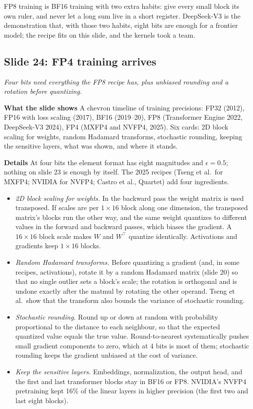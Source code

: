 \documentclass[11pt,letterpaper]{article}
\newcommand{\slide}[3]{%
  \subsection[Slide #1: #2]{Slide #1: #2}%
  {\color{muted}\itshape #3\par}\medskip}
\newcommand{\para}[1]{\medskip\noindent\textbf{#1}\quad}
\newenvironment{intuition}{\begin{tcolorbox}[intuitionbox]}{\end{tcolorbox}}
\begin{document}
\begin{intuition}
FP8 training is BF16 training with two extra habits: give every small block its own ruler, and never let a long sum live in a short register. DeepSeek-V3 is the demonstration that, with those two habits, eight bits are enough for a frontier model; the recipe fits on this slide, and the kernels took a team.
\end{intuition}

\slide{24}{FP4 training arrives}{Four bits need everything the FP8 recipe has, plus unbiased rounding and a rotation before quantizing.}

\para{What the slide shows} A chevron timeline of training precisions: FP32 (2012), FP16 with loss scaling (2017), BF16 (2019--20), FP8 (Transformer Engine 2022, DeepSeek-V3 2024), FP4 (MXFP4 and NVFP4, 2025). Six cards: 2D block scaling for weights, random Hadamard transforms, stochastic rounding, keeping the sensitive layers, what was shown, and where it stands.

\para{Details} At four bits the element format has eight magnitudes and $\epsilon=0.5$; nothing on slide 23 is enough by itself. The 2025 recipes (Tseng et al.\ for MXFP4; NVIDIA for NVFP4; Castro et al., Quartet) add four ingredients.
\begin{itemize}
  \item \emph{2D block scaling for weights.} In the backward pass the weight matrix is used transposed. If scales are per $1\times16$ block along one dimension, the transposed matrix's blocks run the other way, and the same weight quantizes to different values in the forward and backward passes, which biases the gradient. A $16\times16$ block scale makes $W$ and $W^\top$ quantize identically. Activations and gradients keep $1\times16$ blocks.
  \item \emph{Random Hadamard transforms.} Before quantizing a gradient (and, in some recipes, activations), rotate it by a random Hadamard matrix (slide 20) so that no single outlier sets a block's scale; the rotation is orthogonal and is undone exactly after the matmul by rotating the other operand. Tseng et al.\ show that the transform also bounds the variance of stochastic rounding.
  \item \emph{Stochastic rounding.} Round up or down at random with probability proportional to the distance to each neighbour, so that the expected quantized value equals the true value. Round-to-nearest systematically pushes small gradient components to zero, which at 4 bits is most of them; stochastic rounding keeps the gradient unbiased at the cost of variance.
  \item \emph{Keep the sensitive layers.} Embeddings, normalization, the output head, and the first and last transformer blocks stay in BF16 or FP8. NVIDIA's NVFP4 pretraining kept 16\% of the linear layers in higher precision (the first two and last eight blocks).
\end{itemize}
\end{document}
